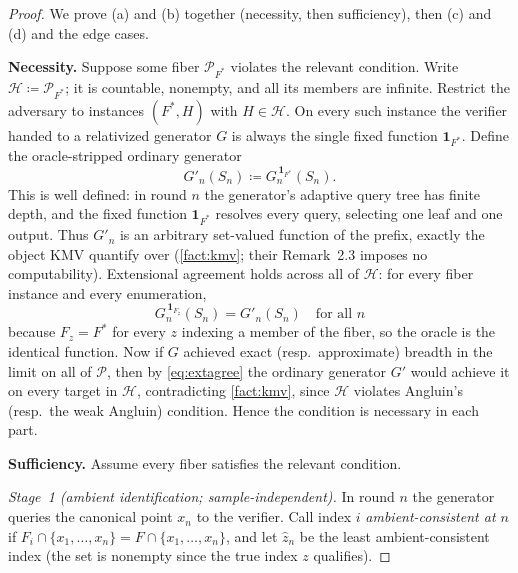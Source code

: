 \documentclass[11pt]{article}
\numberwithin{equation}{section}
\newcommand{\mc}[1]{\mathcal{#1}}
\newcommand{\defeq}{\coloneqq}
\newcommand{\Amb}{F}
\newcommand{\Val}{H}
\newcommand{\Pairs}{\mc{P}}
\newcommand{\Hcal}{\mc{H}}
\newcommand{\Seen}{S}
\newcommand{\fiber}[1]{\Pairs_{#1}}
\theoremstyle{plain}
\theoremstyle{definition}
\theoremstyle{remark}
\begin{document}
\begin{statementbox}
\ThmTaste*
\end{statementbox}
\begin{proof}
We prove (a) and (b) together (necessity, then sufficiency), then (c) and (d) and the edge
cases.

\medskip\noindent\textbf{Necessity.}\quad
Suppose some fiber $\fiber{\Amb^*}$ violates the relevant condition. Write $\Hcal \defeq
\fiber{\Amb^*}$; it is countable, nonempty, and all its members are infinite. Restrict the
adversary to instances $(\Amb^*, \Val)$ with $\Val \in \Hcal$. On every such instance the
verifier handed to a relativized generator $G$ is always the single fixed function $\mathbf
1_{\Amb^*}$. Define the oracle-stripped ordinary generator
\begin{equation}\label{eq:strip}
  G'_n(\Seen_n) \defeq G_n^{\,\mathbf 1_{\Amb^*}}(\Seen_n).
\end{equation}
This is well defined: in round $n$ the generator's adaptive query tree has finite depth, and
the fixed function $\mathbf 1_{\Amb^*}$ resolves every query, selecting one leaf and one
output. Thus $G'_n$ is an arbitrary set-valued function of the prefix, exactly the object KMV
quantify over (\cref{fact:kmv}; their Remark~2.3 imposes no computability). Extensional
agreement holds across all of $\Hcal$: for every fiber instance and every enumeration,
\begin{equation}\label{eq:extagree}
  G_n^{\,\mathbf 1_{\Amb_z}}(\Seen_n) = G'_n(\Seen_n)
  \quad\text{for all } n \tag{$*$}
\end{equation}
because $\Amb_z = \Amb^*$ for every $z$ indexing a member of the fiber, so the oracle is the
identical function. Now if $G$ achieved exact (resp.\ approximate) breadth in the limit on all
of $\Pairs$, then by \eqref{eq:extagree} the ordinary generator $G'$ would achieve it on every
target in $\Hcal$, contradicting \cref{fact:kmv}, since $\Hcal$ violates Angluin's (resp.\ the
weak Angluin) condition. Hence the condition is necessary in each part.

\medskip\noindent\textbf{Sufficiency.}\quad
Assume every fiber satisfies the relevant condition.

\emph{Stage~1 (ambient identification; sample-independent).} In round $n$ the generator
queries the canonical point $x_n$ to the verifier. Call index $i$ \emph{ambient-consistent at
$n$} if $\Amb_i \cap \{x_1, \dots, x_n\} = \Amb \cap \{x_1, \dots, x_n\}$, and let $\hat z_n$
be the least ambient-consistent index (the set is nonempty since the true index $z$
qualifies).


\end{proof}
\end{document}
